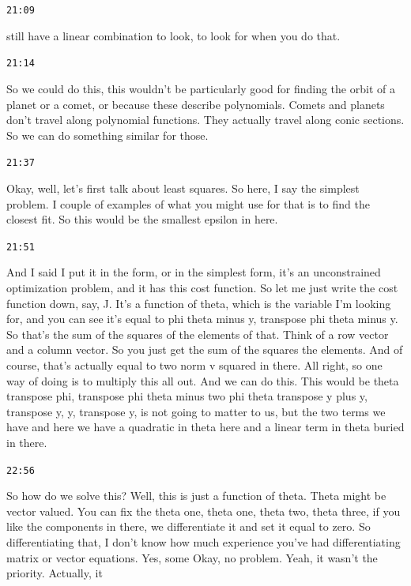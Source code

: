 \documentclass[11pt,a4paper]{article}
\newcommand{\timestamp}[1]{%
  \par\vspace{0.35em}%
  \noindent\colorbox{timestampback}{\textcolor{timestampblue}{\small\texttt{#1}}}%
  \par\vspace{0.2em}%
}
\begin{document}
\timestamp{21:09}

still have a linear combination to look, to look for when you do that.



\timestamp{21:14}

So we could do this, this wouldn't be particularly good for finding the orbit of a planet or a comet, or because these describe polynomials. Comets and planets don't travel along polynomial functions. They actually travel along conic sections. So we can do something similar for those.



\timestamp{21:37}

Okay, well, let's first talk about least squares. So here, I say the simplest problem. I couple of examples of what you might use for that is to find the closest fit. So this would be the smallest epsilon in here.



\timestamp{21:51}

And I said I put it in the form, or in the simplest form, it's an unconstrained optimization problem, and it has this cost function. So let me just write the cost function down, say, J. It's a function of theta, which is the variable I'm looking for, and you can see it's equal to phi theta minus y, transpose phi theta minus y. So that's the sum of the squares of the elements of that. Think of a row vector and a column vector. So you just get the sum of the squares the elements. And of course, that's actually equal to two norm v squared in there. All right, so one way of doing is to multiply this all out. And we can do this. This would be theta transpose phi, transpose phi theta minus two phi theta transpose y plus y, transpose y, y, transpose y, is not going to matter to us, but the two terms we have and here we have a quadratic in theta here and a linear term in theta buried in there.



\timestamp{22:56}

So how do we solve this? Well, this is just a function of theta. Theta might be vector valued. You can fix the theta one, theta one, theta two, theta three, if you like the components in there, we differentiate it and set it equal to zero. So differentiating that, I don't know how much experience you've had differentiating matrix or vector equations. Yes, some Okay, no problem. Yeah, it wasn't the priority. Actually, it
\end{document}
